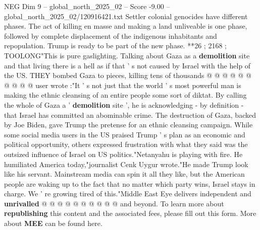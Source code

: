 \begin{textsample}{NEG Dim 9 – global\_north\_2025\_02 – Score -9.00 – global\_north\_2025\_02/120916421.txt}
Settler colonial genocides have different phases.
The act of killing en masse and making a land unliveable is one phase, followed by complete displacement of the indigenous inhabitants and repopulation.
Trump is ready to be part of the new phase. **26 ; 2168 ; TOOLONG"This is pure gaslighting.
Talking about Gaza as a \textbf{demolition} site and that living there is a hell as if that ' s not caused by Israel with the help of the US.
THEY bombed Gaza to pieces, killing tens of thousands @ @ @ @ @ @ @ @ @ @ user wrote :"It ' s not just that the world ' s most powerful man is making the ethnic cleansing of an entire people some sort of diktat.
By calling the whole of Gaza a ' \textbf{demolition} site ', he is acknowledging - by definition - that Israel has committed an abominable crime.
The destruction of Gaza, backed by Joe Biden, gave Trump the pretense for an ethnic cleansing campaign.
While some social media users in the US praised Trump ' s plan as an economic and political opportunity, others expressed frustration with what they said was the outsized influence of Israel on US politics."Netanyahu is playing with fire.
He humiliated America today,"journalist Cenk Uygur wrote."He made Trump look like his servant.
Mainstream media can spin it all they like, but the American people are waking up to the fact that no matter which party wins, Israel stays in charge.
We ' re growing tired of this."Middle East Eye delivers independent and \textbf{unrivalled} @ @ @ @ @ @ @ @ @ @ and beyond.
To learn more about \textbf{republishing} this content and the associated fees, please fill out this form.
More about \textbf{MEE} can be found here.

\end{textsample}
